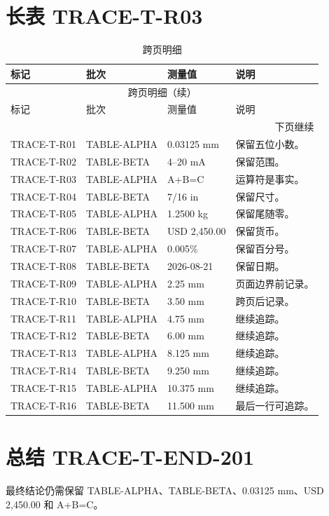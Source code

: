 \documentclass[10pt,a4paper]{ctexart}
\begin{document}
\section{长表 TRACE-T-R03}
\begin{longtable}{p{28mm}p{30mm}p{28mm}p{62mm}}
\caption{跨页明细}\\
\toprule
标记 & 批次 & 测量值 & 说明\\
\midrule
\endfirsthead
\multicolumn{4}{c}{跨页明细（续）}\\
\toprule
标记 & 批次 & 测量值 & 说明\\
\midrule
\endhead
\midrule
\multicolumn{4}{r}{下页继续}\\
\endfoot
\bottomrule
\endlastfoot
TRACE-T-R01 & TABLE-ALPHA & 0.03125 mm & 保留五位小数。\\
TRACE-T-R02 & TABLE-BETA & 4--20 mA & 保留范围。\\
TRACE-T-R03 & TABLE-ALPHA & A+B=C & 运算符是事实。\\
TRACE-T-R04 & TABLE-BETA & 7/16 in & 保留尺寸。\\
TRACE-T-R05 & TABLE-ALPHA & 1.2500 kg & 保留尾随零。\\
TRACE-T-R06 & TABLE-BETA & USD 2,450.00 & 保留货币。\\
TRACE-T-R07 & TABLE-ALPHA & 0.005\% & 保留百分号。\\
TRACE-T-R08 & TABLE-BETA & 2026-08-21 & 保留日期。\\
TRACE-T-R09 & TABLE-ALPHA & 2.25 mm & 页面边界前记录。\\
TRACE-T-R10 & TABLE-BETA & 3.50 mm & 跨页后记录。\\
TRACE-T-R11 & TABLE-ALPHA & 4.75 mm & 继续追踪。\\
TRACE-T-R12 & TABLE-BETA & 6.00 mm & 继续追踪。\\
TRACE-T-R13 & TABLE-ALPHA & 8.125 mm & 继续追踪。\\
TRACE-T-R14 & TABLE-BETA & 9.250 mm & 继续追踪。\\
TRACE-T-R15 & TABLE-ALPHA & 10.375 mm & 继续追踪。\\
TRACE-T-R16 & TABLE-BETA & 11.500 mm & 最后一行可追踪。\\
\end{longtable}

\section{总结 TRACE-T-END-201}
最终结论仍需保留 TABLE-ALPHA、TABLE-BETA、0.03125 mm、USD 2,450.00 和 A+B=C。
\end{document}
